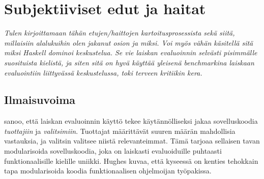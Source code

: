 

\section{Subjektiiviset edut ja haitat} \label{subjektiiviset-edut}

\textit{Tulen kirjoittamaan tähän etujen/haittojen kartoitusprosessista sekä siitä, millaisiin alalukuihin olen jakanut osion ja miksi. Voi myös vähän käsitellä sitä miksi Haskell dominoi keskustelua. Se vie laiskan evaluoinnin selvästi pisimmälle suosituista kielistä, ja siten sitä on hyvä käyttää yleisenä benchmarkina laiskaan evaluointiin liittyvässä keskustelussa, toki terveen kritiikin kera. }

\subsection{Ilmaisuvoima}
\citet{hughes1989functional} sanoo, että laiskan evaluoinnin käyttö tekee käytännölliseksi jakaa sovelluskoodia \textit{tuottajiin} ja \textit{valitsimiin}. Tuottajat määrittävät suuren määrän mahdollisia vastauksia, ja valitsin valitsee niistä relevanteimmat. Tämä tarjoaa sellaisen tavan modularisoida sovelluskoodia, joka on laiskasti evaluoiduille puhtaasti funktionaalisille kielille uniikki. Hughes kuvaa, että kyseessä on kenties tehokkain tapa modularisoida koodia funktionaalisen ohjelmoijan työpakissa.

